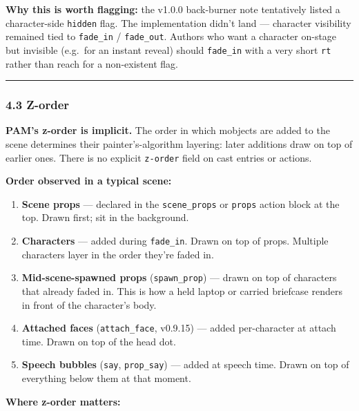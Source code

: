 \documentclass[
  11pt,
]{book}
\providecommand{\tightlist}{%
  \setlength{\itemsep}{0pt}\setlength{\parskip}{0pt}}
\begin{document}
\textbf{Why this is worth flagging:} the v1.0.0 back-burner note
tentatively listed a character-side \texttt{hidden} flag. The
implementation didn't land --- character visibility remained tied to
\texttt{fade\_in} / \texttt{fade\_out}. Authors who want a character
on-stage but invisible (e.g.~for an instant reveal) should
\texttt{fade\_in} with a very short \texttt{rt} rather than reach for a
non-existent flag.

\begin{center}\rule{0.5\linewidth}{0.5pt}\end{center}

\subsubsection{4.3 Z-order}\label{z-order}

\textbf{PAM's z-order is implicit.} The order in which mobjects are
added to the scene determines their painter's-algorithm layering: later
additions draw on top of earlier ones. There is no explicit
\texttt{z-order} field on cast entries or actions.

\textbf{Order observed in a typical scene:}

\begin{enumerate}
\def\labelenumi{\arabic{enumi}.}
\tightlist
\item
  \textbf{Scene props} --- declared in the \texttt{scene\_props} or
  \texttt{props} action block at the top. Drawn first; sit in the
  background.
\item
  \textbf{Characters} --- added during \texttt{fade\_in}. Drawn on top
  of props. Multiple characters layer in the order they're faded in.
\item
  \textbf{Mid-scene-spawned props} (\texttt{spawn\_prop}) --- drawn on
  top of characters that already faded in. This is how a held laptop or
  carried briefcase renders in front of the character's body.
\item
  \textbf{Attached faces} (\texttt{attach\_face}, v0.9.15) --- added
  per-character at attach time. Drawn on top of the head dot.
\item
  \textbf{Speech bubbles} (\texttt{say}, \texttt{prop\_say}) --- added
  at speech time. Drawn on top of everything below them at that moment.
\end{enumerate}

\textbf{Where z-order matters:}
\end{document}
